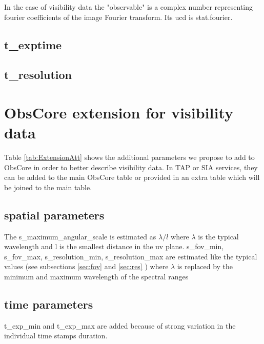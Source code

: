 \documentclass[11pt,a4paper]{ivoa}
\begin{document}
In the case of visibility data the "observable" is a complex number representing fourier coefficients of the image Fourier transform. Its ucd is stat.fourier. 

\subsection{t\_exptime}

\subsection{t\_resolution}


\section{ObsCore extension for visibility data}

Table \ref{tab:ExtensionAtt} shows the additional parameters we propose to add to ObsCore in order to better describe visibility data.
In TAP or SIA services, they can be added to the main ObsCore table or provided in an extra table which will be joined to the main table. 
\subsection{spatial parameters}

The s\_maximum\_angular\_scale is estimated as $\lambda/l$ where $\lambda$ is the typical wavelength and l is the smallest distance in the uv plane. s\_fov\_min, s\_fov\_max, s\_resolution\_min, s\_resolution\_max are estimated like the typical values (see subsections \ref{sec:fov} and \ref{sec:res} ) where $\lambda$ is replaced by the minimum and maximum wavelength of the spectral ranges

\subsection{time parameters}

t\_exp\_min and t\_exp\_max are added because of strong variation in the individual time stamps duration.
\end{document}
